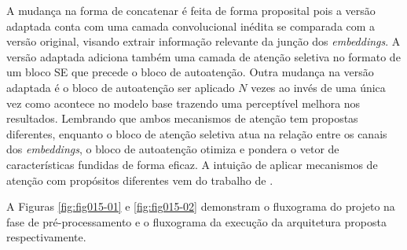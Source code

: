 A mudança na forma de concatenar é feita de forma proposital pois a versão adaptada conta com uma camada convolucional inédita se comparada com a versão original, visando extrair informação relevante da junção dos \textit{embeddings}. A versão adaptada adiciona também uma camada de atenção seletiva no formato de um bloco \gls{SE} que precede o bloco de autoatenção. Outra mudança na versão adaptada é o bloco de autoatenção ser aplicado $N$ vezes ao invés de uma única vez como acontece no modelo base trazendo uma perceptível melhora nos resultados. Lembrando que ambos mecanismos de atenção tem propostas diferentes, enquanto o bloco de atenção seletiva atua na relação entre os canais dos \textit{embeddings}, o bloco de autoatenção otimiza e pondera o vetor de características fundidas de forma eficaz. A intuição de aplicar mecanismos de atenção com propósitos diferentes vem do trabalho de \cite{yangNeuralNetworkDesign2024a}. 

A Figuras \ref{fig:fig015-01} e \ref{fig:fig015-02} demonstram o fluxograma do projeto na fase de pré-processamento e o fluxograma da execução da arquitetura proposta respectivamente.

